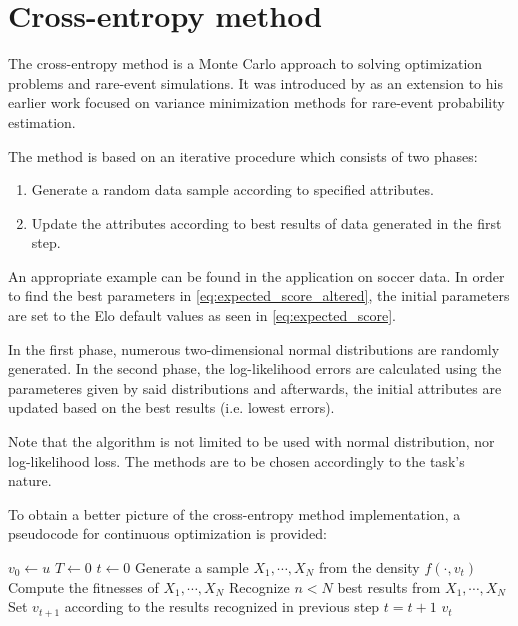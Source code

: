\chapter{Cross-entropy method}
\label{ch:cross_entropy_method}
The cross-entropy method is a Monte Carlo approach to solving optimization problems and rare-event simulations. It was introduced by \citet{RubinsteinCrossEntropyMethodCombinatorial1999} as an extension to his earlier work focused on variance minimization methods for rare-event probability estimation.

The method is based on an iterative procedure which consists of two phases:

\begin{enumerate}
\item Generate a random data sample according to specified attributes.
\item Update the attributes according to best results of data generated in the first step.
\end{enumerate}

\examplespace
\begin{example}
An appropriate example can be found in the application on soccer data. In order to find the best parameters in \eqref{eq:expected_score_altered}, the initial parameters are set to the Elo default values as seen in \eqref{eq:expected_score}.

In the first phase, numerous two-dimensional normal distributions are randomly generated. In the second phase, the log-likelihood errors are calculated using the parameteres given by said distributions and afterwards, the initial attributes are updated based on the best results (i.e. lowest errors).

Note that the algorithm is not limited to be used with normal distribution, nor log-likelihood loss. The methods are to be chosen accordingly to the task's nature. 
\end{example}

To obtain a better picture of the cross-entropy method implementation, a pseudocode for continuous optimization is provided:

\begin{algorithm}[H]
\begin{algorithmic}
\State $v_0 \gets u$
\State $T \gets 0$
\State $t \gets 0$
	\State Generate a sample $X_1, \cdots, X_N$ from the density $f(\cdot, v_t)$
	\State Compute the fitnesses of $X_1, \cdots, X_N$
	\State Recognize $n < N$ best results from $X_1, \cdots, X_N$
	\State Set $v_{t+1}$ according to the results recognized in previous step
	\State $t = t + 1$
\EndWhile
\State \Return $v_t$
\end{algorithmic}
\end{algorithm}